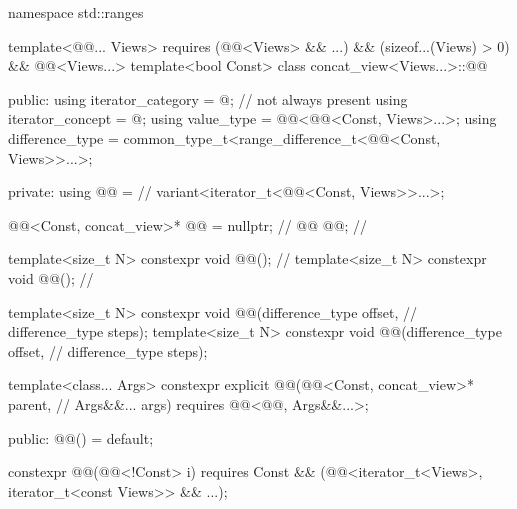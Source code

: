 %
%
\begin{codeblock}
namespace std::ranges {
  template<@@... Views>
    requires (@@<Views> && ...) && (sizeof...(Views) > 0) &&
              @@<Views...>
  template<bool Const>
  class concat_view<Views...>::@@ {

  public:
    using iterator_category = @\seebelow@;                                // not always present
    using iterator_concept = @\seebelow@;
    using value_type = @@<@@<Const, Views>...>;
    using difference_type = common_type_t<range_difference_t<@@<Const, Views>>...>;

  private:
    using @@ =                                                       // \expos
      variant<iterator_t<@@<Const, Views>>...>;

    @@<Const, concat_view>* @@ = nullptr;                     // \expos
    @@ @@;                                                          // \expos

    template<size_t N>
      constexpr void @@();                                             // \expos
    template<size_t N>
      constexpr void @@();                                                // \expos

    template<size_t N>
      constexpr void @@(difference_type offset,                    // \expos
                                 difference_type steps);
    template<size_t N>
      constexpr void @@(difference_type offset,                    // \expos
                                 difference_type steps);

    template<class... Args>
      constexpr explicit @@(@@<Const, concat_view>* parent,  // \expos
                                  Args&&... args)
        requires @@<@@, Args&&...>;

  public:
    @@() = default;

    constexpr @@(@@<!Const> i)
      requires Const && (@@<iterator_t<Views>, iterator_t<const Views>> && ...);

}}
\end{codeblock}
